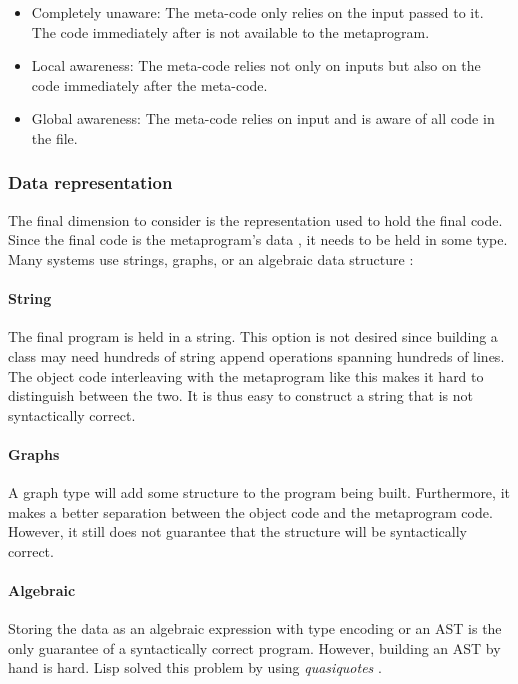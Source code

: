 \begin{itemize}
	\item Completely unaware: The meta-code only relies on the input passed to it.
	      The code immediately after is not available to the metaprogram.
	\item Local awareness: The meta-code relies not only on inputs but also on the code immediately after the meta-code.
	\item Global awareness: The meta-code relies on input and is aware of all code in the file.
\end{itemize}

\subsubsection{Data representation}
The final dimension to consider is the representation used to hold the final code.
Since the final code is the metaprogram's data \cite{bawden_99_01}, it needs to be held in some type.
Many systems use strings, graphs, or an algebraic data structure \cite{sheard_01_01}:

\paragraph{String}
The final program is held in a string.
This option is not desired since building a class may need hundreds of string append operations spanning hundreds of lines.
The object code interleaving with the metaprogram like this makes it hard to distinguish between the two.
It is thus easy to construct a string that is not syntactically correct.

\paragraph{Graphs}
A graph type will add some structure to the program being built.
Furthermore, it makes a better separation between the object code and the metaprogram code.
However, it still does not guarantee that the structure will be syntactically correct.

\paragraph{Algebraic}
Storing the data as an algebraic expression with type encoding or an AST is the only guarantee of a syntactically correct program.
However, building an AST by hand is hard.
Lisp solved this problem by using \textit{quasiquotes} \cite{bawden_99_01}.


